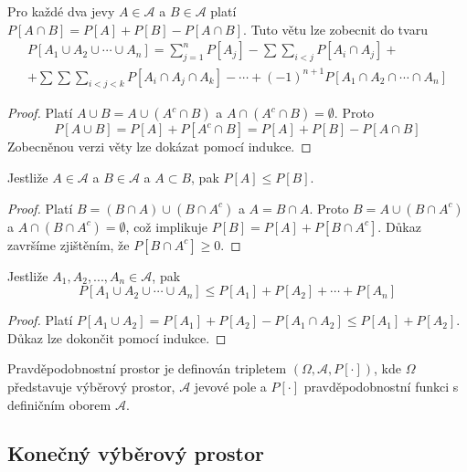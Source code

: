 \begin{theorem}
Pro každé dva jevy $A \in \mathscr{A}$ a $B \in \mathscr{A}$ platí $P[A \cap B] = P[A] + P[B] - P[A \cap B]$. Tuto větu lze zobecnit do tvaru
\begin{gather*}
P[A_1 \cup A_2 \cup \cdots \cup A_n] = \sum_{j=1}^n P[A_j] - \sum \sum_{i<j}P[A_i \cap A_j] + \\ +\sum \sum \sum_{i<j<k}P[A_i \cap A_j \cap A_k] - \cdots + (-1)^{n+1}P[A_1 \cap A_2 \cap \cdots \cap A_n]
\end{gather*}
\end{theorem}
\begin{proof}
Platí $A \cup B = A \cup (A^c \cap B)$ a $A \cap (A^c \cap B) = \emptyset$. Proto
\begin{equation*}
P[A \cup B] = P[A] + P[A^c \cap B] = P[A] + P[B] - P[A \cap B]
\end{equation*}
Zobecněnou verzi věty lze dokázat pomocí indukce.
\end{proof}
\begin{theorem}
Jestliže $A \in \mathscr{A}$ a $B \in \mathscr{A}$ a $A \subset B$, pak $P[A] \le P[B]$.
\end{theorem}
\begin{proof}
Platí $B = (B \cap A) \cup (B \cap A^c)$ a $A = B \cap A$. Proto $B = A \cup (B \cap A^c)$ a $A \cap (B \cap A^c) = \emptyset$, což implikuje $P[B]=P[A]+P[B \cap A^c]$. Důkaz završíme zjištěním, že $P[B \cap A^c] \ge 0$.
\end{proof}
\begin{theorem}
Jestliže $A_1, A_2, ..., A_n \in \mathscr{A}$, pak
\begin{equation*}
P[A_1 \cup A_2 \cup \cdots \cup A_n] \le P[A_1] + P[A_2] + \cdots + P[A_n]
\end{equation*}
\end{theorem}
\begin{proof}
Platí $P[A_1 \cup A_2] = P[A_1] + P[A_2] - P[A_1 \cap A_2] \le P[A_1] + P[A_2]$. Důkaz lze dokončit pomocí indukce.
\end{proof}
\begin{definition}
Pravděpodobnostní prostor je definován tripletem $(\Omega, \mathscr{A}, P[\cdot])$, kde $\Omega$ představuje výběrový prostor, $\mathscr{A}$ jevové pole a $P[\cdot]$ pravděpodobnostní funkci s definičním oborem $\mathscr{A}$.
\end{definition}

\subsection{Konečný výběrový prostor}

